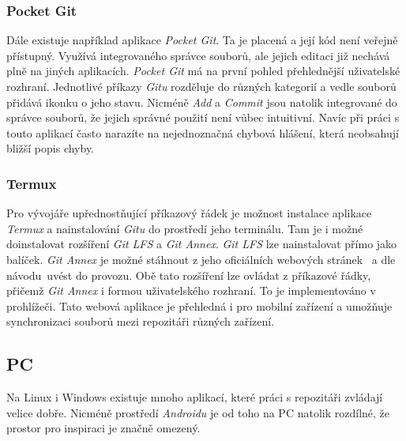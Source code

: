         \subsubsection{Pocket Git~}
        Dále existuje například aplikace \emph{Pocket Git}. Ta je placená a její kód není veřejně přístupný. Využívá integrovaného správce souborů, ale jejich editaci již nechává plně na jiných aplikacích. \emph{Pocket Git} má na první pohled přehlednější uživatelské rozhraní. Jednotlivé příkazy \emph{Gitu} rozděluje do různých kategorií a vedle souborů přidává ikonku o jeho stavu. Nicméně \emph{Add} a \emph{Commit} jsou natolik integrované do správce souborů, že jejich správné použití není vůbec intuitivní. Navíc při práci s touto aplikací často narazíte na nejednoznačná chybová hlášení, která neobsahují bližší popis chyby.

        \subsubsection{Termux~}
        Pro vývojáře upřednostňující příkazový řádek je možnost instalace aplikace \emph{Termux} a nainstalování \emph{Gitu} do prostředí jeho terminálu. Tam je i možné doinstalovat rozšíření \emph{Git LFS} a \emph{Git Annex}. \emph{Git LFS} lze nainstalovat přímo jako balíček. \emph{Git Annex} je možné stáhnout z jeho oficiálních webových stránek~ a dle návodu~uvést do provozu. Obě tato rozšíření lze ovládat z příkazové řádky, přičemž \emph{Git Annex} i formou uživatelského rozhraní. To je implementováno v prohlížeči. Tato webová aplikace je přehledná i pro mobilní zařízení a umožňuje synchronizaci souborů mezi repozitáři různých zařízení.

    \subsection {PC}
    Na Linux i Windows existuje mnoho aplikací, které práci s repozitáři zvládají velice dobře. Nicméně prostředí \emph{Androidu} je od toho na PC natolik rozdílné, že prostor pro inspiraci je značně omezený.
